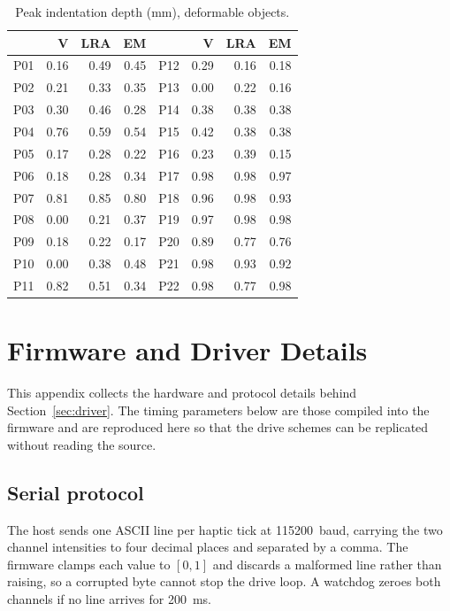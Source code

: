 \documentclass[12pt, a4paper, twoside, openright]{report}
\begin{document}
\begin{table}[ht]
    \centering
    \small
    \caption{Peak indentation depth (mm), deformable objects.}
    \label{tab:appB-def-depth}
    \begin{tabular}{@{}lrrr@{\hspace{2em}}lrrr@{}}
        \toprule
            & V    & LRA  & EM   &     & V    & LRA  & EM   \\
        \midrule
        P01 & 0.16 & 0.49 & 0.45 & P12 & 0.29 & 0.16 & 0.18 \\
        P02 & 0.21 & 0.33 & 0.35 & P13 & 0.00 & 0.22 & 0.16 \\
        P03 & 0.30 & 0.46 & 0.28 & P14 & 0.38 & 0.38 & 0.38 \\
        P04 & 0.76 & 0.59 & 0.54 & P15 & 0.42 & 0.38 & 0.38 \\
        P05 & 0.17 & 0.28 & 0.22 & P16 & 0.23 & 0.39 & 0.15 \\
        P06 & 0.18 & 0.28 & 0.34 & P17 & 0.98 & 0.98 & 0.97 \\
        P07 & 0.81 & 0.85 & 0.80 & P18 & 0.96 & 0.98 & 0.93 \\
        P08 & 0.00 & 0.21 & 0.37 & P19 & 0.97 & 0.98 & 0.98 \\
        P09 & 0.18 & 0.22 & 0.17 & P20 & 0.89 & 0.77 & 0.76 \\
        P10 & 0.00 & 0.38 & 0.48 & P21 & 0.98 & 0.93 & 0.92 \\
        P11 & 0.82 & 0.51 & 0.34 & P22 & 0.98 & 0.77 & 0.98 \\
        \bottomrule
    \end{tabular}
\end{table}

\chapter{Firmware and Driver Details}
\label{app:firmware}

This appendix collects the hardware and protocol details behind
Section~\ref{sec:driver}. The timing parameters below are those compiled into
the firmware and are reproduced here so that the drive schemes can be
replicated without reading the source.

\section*{Serial protocol}

The host sends one ASCII line per haptic tick at \SI{115200}{baud}, carrying
the two channel intensities to four decimal places and separated by a comma.
The firmware clamps each value to $[0,1]$ and discards a malformed line rather
than raising, so a corrupted byte cannot stop the drive loop. A watchdog zeroes
both channels if no line arrives for \SI{200}{\milli\second}.
\end{document}
